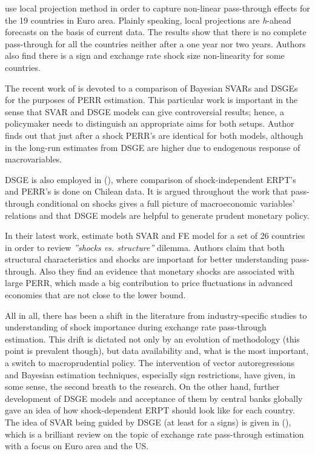 \documentclass[12pt, a4paper]{extarticle}
\begin{document}
\textcite{Colavecchio2019} use local projection method in order to capture non-linear pass-through effects for the 19 countries in Euro area. Plainly speaking, local projections are \textit{h}-ahead forecasts on the basis of current data. The results show that there is no complete pass-through for all the countries neither after a one year nor two years. Authors also find there is a sign and exchange rate shock size non-linearity for some countries.

The recent work of \textcite{Comunale2020} is devoted to a comparison of Bayesian SVARs and DSGEs for the purposes of PERR estimation. This particular work is important in the sense that SVAR and DSGE models can give controversial results; hence, a policymaker needs to distinguish an appropriate aims for both setups. Author finds out that just after a shock PERR's are identical for both models, although in the long-run estimates from DSGE are higher due to endogenous response of macrovariables. 

DSGE is also employed in (\cite{GarciaCicco2020}), where comparison of shock-independent ERPT's and PERR's is done on Chilean data. It is argued throughout the work that pass-through conditional on shocks gives a full picture of macroeconomic variables' relations and that DSGE models are helpful to generate prudent monetary policy. 

In their latest work, \textcite{Forbes2020} estimate both SVAR and FE model for a set of 26 countries in order to review \textit{''shocks vs. structure''} dilemma. Authors claim that both structural characteristics and shocks are important for better understanding pass-through. Also they find an evidence that monetary shocks are associated with large PERR, which made a big contribution to price fluctuations in advanced economies that are not close to the lower bound.

All in all, there has been a shift in the literature from industry-specific studies to understanding of shock importance during exchange rate pass-through estimation. This drift is dictated not only by an evolution of methodology (this point is prevalent though), but data availability and, what is the most important, a switch to macroprudential policy. The intervention of vector autoregressions and Bayesian estimation techniques, especially sign restrictions, have given, in some sense, the second breath to the research. On the other hand, further development of DSGE models and acceptance of them by central banks globally gave an idea of how shock-dependent ERPT should look like for each country. The idea of SVAR being guided by DSGE (at least for a signs) is given in (\cite{Ortega2020}), which is a brilliant review on the topic of exchange rate pass-through estimation with a focus on Euro area and the US.
\end{document}
